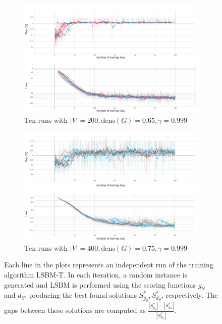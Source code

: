 \documentclass[draft,final]{vutinfth} %
\begin{document}
\begin{figure}
    \centering
    \begin{subfigure}{0.99\textwidth}
        \centering
        \includegraphics[width=\textwidth]{graphics/training-plot-2.pdf}
        \caption{Ten runs with $|V|=200, \mathrm{dens}(G)=0.65, \gamma=0.999$}
    \end{subfigure}
    \begin{subfigure}{0.99\textwidth}
        \centering
        \includegraphics[width=\textwidth]{graphics/training-plot-1.pdf}
        \caption{Ten runs with $|V|=400, \mathrm{dens}(G)=0.75, \gamma=0.999$}
    \end{subfigure}
    \caption{Each line in the plots represents an independent run of the training algorithm LSBM-T. In each iteration, a random instance is generated and LSBM is performed using the scoring functions $g_S$ and $d_S$, producing the best found solutions $S^*_{g_S}, S^*_{d_S}$, respectively. The gaps between these solutions are computed as $\frac{|S^*_{g_S}| - |S^*_{d_S}|}{|S^*_{d_S}|}$.}
    \label{fig:training-line-plot}
\end{figure}
\end{document}
